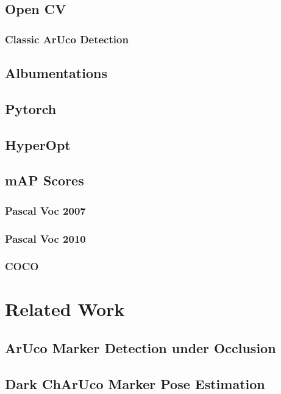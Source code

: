 \documentclass[10pt]{book}
\begin{document}
\section{Open CV}

\subsection{Classic ArUco Detection}

\section{Albumentations}

\section{Pytorch}

\section{HyperOpt}

\section{mAP Scores}

\subsection{Pascal Voc 2007}

\subsection{Pascal Voc 2010}

\subsection{COCO}

\chapter{Related Work}
\label{chap:relatedw}

\section{ArUco Marker Detection under Occlusion}

\section{Dark ChArUco Marker Pose Estimation}
\end{document}
